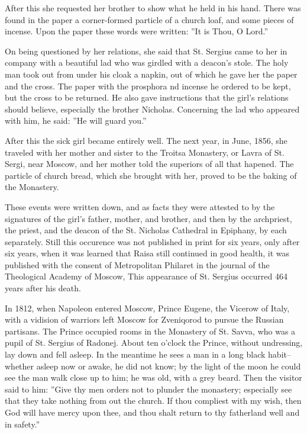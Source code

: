 After this she requested her brother to show what he held in his hand. There was found in the paper a corner-formed particle of a church loaf, and some pieces of incense. Upon the paper these words were written: ''It is Thou, O Lord.''

On being questioned by her relations, she said that St. Sergius came to her in company with a beautiful lad who was girdled with a deacon's stole. The holy man took out from under his cloak a napkin, out of which he gave her the paper and the cross. The paper with the prosphora nd incense he ordered to be kept, but the cross to be returned. He also gave instructions that the girl's relations should believe, especially the brother Nicholas. Concerning the lad who appeared with him, he said: ''He will guard you.''

After this the sick girl became entirely well. The next year, in June, 1856, she traveled with her mother and sister to the Troitsa Monastery, or Lavra of St. Sergi, near Moscow, and her mother told the superiors of all that hapened. The particle of church bread, which she brought with her, proved to be the baking of the Monastery.

These events were written down, and as facts they were attested to by the signatures of the girl's father, mother, and brother, and then by the archpriest, the priest, and the deacon of the St. Nicholas Cathedral in Epiphany, by each separately. Still this occurence was not published in print for six years, only after six years, when it was learned that Raisa still continued in good health, it was published with the consent of Metropolitan Philaret in the journal of the Theological Academy of Moscow, This appearance of St. Sergius occurred 464 years after his death.

In 1812, when Napoleon entered Moscow, Prince Eugene, the Vicerow of Italy, with a vidision of warriors left Moscow for Zveniqorod to pursue the Russian partisans. The Prince occupied rooms in the Monastery of St. Savva, who was a pupil of St. Sergius of Radonej. About ten o'clock the Prince, without undressing, lay down and fell asleep. In the meantime he sees a man in a long black habit--whether asleep now or awake, he did not know; by the light of the moon he could see the man walk close up to him; he was old, with a grey beard. Then the visitor said to him: ''Give thy men orders not to plunder the monastery; especially see that they take nothing from out the church. If thou compliest with my wish, then God will have mercy upon thee, and thou shalt return to thy fatherland well and in safety.''

